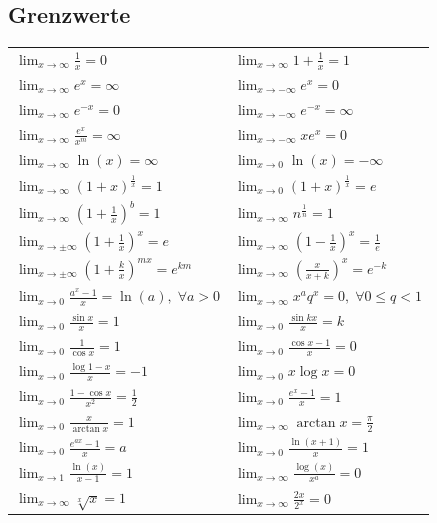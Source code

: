\documentclass[a4paper,10pt]{article}
\def\limxo{\lim_{x\to 0}}
\def\limxi{\lim_{x\to\infty}}
\def\limxn{\lim_{x\to-\infty}}
\begin{document}
\subsection{Grenzwerte}
\begin{center}
  \begin{tabularx}{\linewidth}{XX}
    \toprule
    $\displaystyle \limxi \frac{1}{x} = 0$ &
    $\displaystyle \limxi 1 + \frac{1}{x} = 1$ \\
    $\displaystyle \limxi e^x = \infty$ &
    $\displaystyle \limxn e^x = 0$ \\
    $\displaystyle \limxi e^{-x} = 0$ &
    $\displaystyle \limxn e^{-x} = \infty$ \\
    $\displaystyle \limxi \frac{e^x}{x^m} = \infty$ &
    $\displaystyle \limxn xe^x = 0$ \\
    $\displaystyle \limxi \ln(x) = \infty$ &
    $\displaystyle \limxo \ln(x) = -\infty$ \\
    $\displaystyle \limxi (1+x)^{\frac{1}{x}} = 1$ &
    $\displaystyle \limxo (1+x)^{\frac{1}{x}} = e$ \\
    $\displaystyle \limxi (1+\frac{1}{x})^b = 1$ &
    $\displaystyle \limxi n^{\frac{1}{n}} = 1$ \\
    $\displaystyle \lim_{x\to\pm\infty} (1 + \frac{1}{x})^x = e$ &
    $\displaystyle \limxi (1-\frac{1}{x})^x = \frac{1}{e}$ \\
    $\displaystyle \lim_{x\to\pm\infty} (1 + \frac{k}{x})^{mx} = e^{km}$ &
    $\displaystyle \limxi (\frac{x}{x+k})^x = e^{-k}$ \\
    $\displaystyle \limxo \frac{a^x -1}{x} = \ln(a), \; \forall a > 0$ &
    $\displaystyle \limxi x^a q^x = 0, \; \forall 0 \le q < 1$ \\
    $\limxo \frac{\sin x}{x} = 1$ & $\limxo \frac{\sin kx}{x} = k$\\
    $\limxo \frac{1}{\cos x} = 1$ & $\limxo \frac{\cos x -1}{x} = 0$ \\
    $\limxo \frac{\log 1 - x}{x} = -1$ & $\limxo x \log x = 0$\\
    $\limxo \frac{1 - \cos x}{x^2} = \frac{1}{2}$ & $\limxo \frac{e^x-1}{x} = 1$ \\
    $\limxo \frac{x}{\arctan x} = 1$ & $\limxi \arctan x = \frac{\pi}{2}$ \\
    $\limxo \frac{e^{ax}-1}{x} = a$ & $\limxo \frac{\ln(x+1)}{x} = 1$ \\
    $\lim_{x\to 1} \frac{\ln(x)}{x-1} = 1$ & $\limxi \frac{\log(x)}{x^a} = 0$ \\
    $\limxi \sqrt[x]{x} = 1$ & $\limxi \frac{2x}{2^x} = 0$ \\
    \bottomrule
  \end{tabularx}
\end{center}
\end{document}
